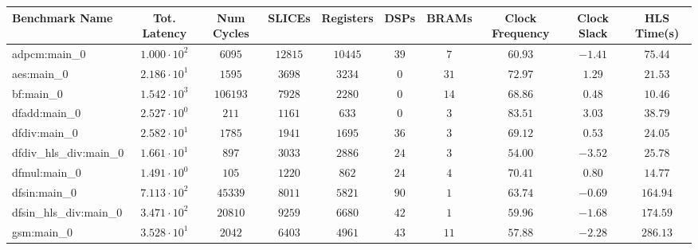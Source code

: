 \begin{tabular}{|l|c|c|c|c|c|c|c|c|c|}
\hline
Benchmark Name          & Tot. Latency           & Num Cycles & SLICEs    & Registers & DSPs    & BRAMs   & Clock Frequency & Clock Slack & HLS Time(s) \\
\hline
adpcm:main\_0           & $ 1.000 \cdot 10^{2} $ & $ 6095   $ & $ 12815 $ & $ 10445 $ & $ 39  $ & $ 7   $ & $ 60.93       $ & $ -1.41   $ & $ 75.44   $ \\
aes:main\_0             & $ 2.186 \cdot 10^{1} $ & $ 1595   $ & $ 3698  $ & $ 3234  $ & $ 0   $ & $ 31  $ & $ 72.97       $ & $ 1.29    $ & $ 21.53   $ \\
bf:main\_0              & $ 1.542 \cdot 10^{3} $ & $ 106193 $ & $ 7928  $ & $ 2280  $ & $ 0   $ & $ 14  $ & $ 68.86       $ & $ 0.48    $ & $ 10.46   $ \\
dfadd:main\_0           & $ 2.527 \cdot 10^{0} $ & $ 211    $ & $ 1161  $ & $ 633   $ & $ 0   $ & $ 3   $ & $ 83.51       $ & $ 3.03    $ & $ 38.79   $ \\
dfdiv:main\_0           & $ 2.582 \cdot 10^{1} $ & $ 1785   $ & $ 1941  $ & $ 1695  $ & $ 36  $ & $ 3   $ & $ 69.12       $ & $ 0.53    $ & $ 24.05   $ \\
dfdiv\_hls\_div:main\_0 & $ 1.661 \cdot 10^{1} $ & $ 897    $ & $ 3033  $ & $ 2886  $ & $ 24  $ & $ 3   $ & $ 54.00       $ & $ -3.52   $ & $ 25.78   $ \\
dfmul:main\_0           & $ 1.491 \cdot 10^{0} $ & $ 105    $ & $ 1220  $ & $ 862   $ & $ 24  $ & $ 4   $ & $ 70.41       $ & $ 0.80    $ & $ 14.77   $ \\
dfsin:main\_0           & $ 7.113 \cdot 10^{2} $ & $ 45339  $ & $ 8011  $ & $ 5821  $ & $ 90  $ & $ 1   $ & $ 63.74       $ & $ -0.69   $ & $ 164.94  $ \\
dfsin\_hls\_div:main\_0 & $ 3.471 \cdot 10^{2} $ & $ 20810  $ & $ 9259  $ & $ 6680  $ & $ 42  $ & $ 1   $ & $ 59.96       $ & $ -1.68   $ & $ 174.59  $ \\
gsm:main\_0             & $ 3.528 \cdot 10^{1} $ & $ 2042   $ & $ 6403  $ & $ 4961  $ & $ 43  $ & $ 11  $ & $ 57.88       $ & $ -2.28   $ & $ 286.13  $ \\

\end{tabular}
